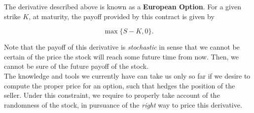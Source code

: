 \documentclass[../TGMAFFIRO]{subfiles}
\begin{document}
The derivative described above is known as a \textbf{European Option}. For a given strike $K$, at maturity, the payoff provided by this contract is given by

\begin{equation}
	\max\{S-K, 0\}.
\end{equation}

Note that the payoff of this derivative is \textit{stochastic} in sense that we cannot be certain of the price the stock will reach some future time from now. Then, we cannot be sure of the future payoff of the stock.\\

The knowledge and tools we currently have can take us only so far if we desire to compute the proper price for an option, such that hedges the position of the seller. Under this constraint, we require to properly take account of the randomness of the stock, in pursuance of the \textit{right} way to price this derivative.
\end{document}
